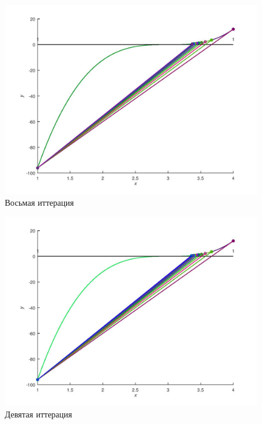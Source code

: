 \documentclass[a4paper,12pt]{article}
\begin{document}
    \begin{figure}[H]
        \centering
        \includegraphics[scale=0.4]{8secantitter.jpg}
        \caption{Восьмая иттерация}
    \end{figure}
    \begin{figure}[H]
        \centering
        \includegraphics[scale=0.4]{9secantitter.jpg}
        \caption{Девятая иттерация}
    \end{figure}
\newpage    

\end{document}

